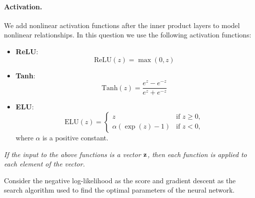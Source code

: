 \documentclass[11pt]{exam}
\begin{document}
\paragraph{Activation.}
We add nonlinear activation functions after the inner product layers to model
nonlinear relationships.
In this question we use the following activation functions:
\begin{itemize}
	\item \textbf{ReLU}: 
	\begin{equation}
	    \text{ReLU}(z) = \max(0, z) 
	    \label{eq:relu}
	\end{equation}

	\item \textbf{Tanh}: 
	\begin{equation}
\text{Tanh}(z) = \frac{e^{z}-e^{-z}}{e^{z}+e^{-z}}
	    \label{eq:tanh}
	\end{equation}
    
 \item \textbf{ELU}:  
		\begin{equation}
\text{ELU}(z) = \begin{cases} z & \text{if }z \geq 0,\\ \alpha (\exp(z) - 1) &\text{if } z < 0, \end{cases}
	    \label{eq:elu}
	\end{equation}
   where $\alpha$ is a positive constant.
\end{itemize}

{\em If the input to the above functions is a vector ${\bf z}$, then each function is applied to each element of the vector.}

Consider the negative log-likelihood as the score and gradient descent as the search algorithm used to find the optimal parameters of the neural network.
\end{document}
